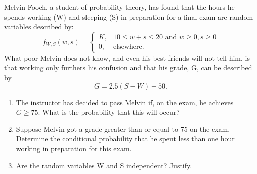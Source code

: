 \begin{exercise}
Melvin Fooch, a student of probability theory, has found that the hours he spends working (W) and sleeping (S) in preparation for a final exam are random variables described by:
\[
f_{W,S}(w, s) =
\begin{cases}
K, & 10 \leq w + s \leq 20 \text{ and } w \geq 0, s \geq 0 \\
0, & \text{elsewhere.}
\end{cases}
\]
What poor Melvin does not know, and even his best friends will not tell him, is that working only furthers his confusion and that his grade, G, can be described by 
\[
G = 2.5(S - W) + 50.
\]
\begin{enumerate}[label=(\alph*)]
    \item The instructor has decided to pass Melvin if, on the exam, he achieves \( G \geq 75 \). What is the probability that this will occur?
    \item Suppose Melvin got a grade greater than or equal to 75 on the exam. Determine the conditional probability that he spent less than one hour working in preparation for this exam.
    \item Are the random variables W and S independent? Justify.
\end{enumerate}
\end{exercise}


